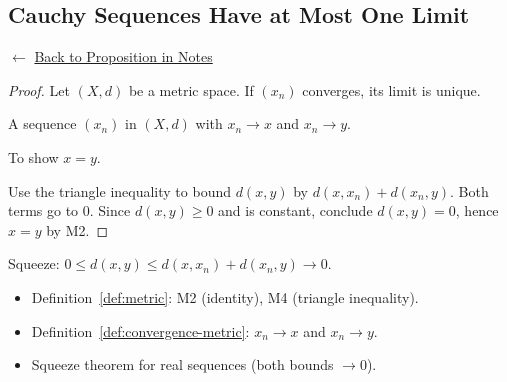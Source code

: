
\subsection*{Cauchy Sequences Have at Most One Limit}
\label{prf:cauchy-unique-limit}

\begin{remark*}[Return]
$\leftarrow$ \hyperref[prop:cauchy-unique-limit]{Back to Proposition in Notes}
\end{remark*}

\begin{proof}
\Claim Let $(X,d)$ be a metric space.
If $(x_n)$ converges, its limit is unique.

\Given A sequence $(x_n)$ in $(X,d)$ with $x_n \to x$ and $x_n \to y$.

\Goal To show $x = y$.

\Strategy Use the triangle inequality to bound $d(x,y)$ by $d(x, x_n) + d(x_n, y)$.
Both terms go to $0$. Since $d(x,y) \ge 0$ and is constant, conclude $d(x,y) = 0$,
hence $x = y$ by M2.


\end{proof}

\begin{remark*}
Squeeze: $0 \le d(x,y) \le d(x,x_n) + d(x_n,y) \to 0$.
\end{remark*}

\begin{remark*}[Dependencies]
\begin{itemize}
  \item Definition~\ref{def:metric}: M2 (identity), M4 (triangle inequality).
  \item Definition~\ref{def:convergence-metric}: $x_n \to x$ and $x_n \to y$.
  \item Squeeze theorem for real sequences (both bounds $\to 0$).
\end{itemize}
\end{remark*}
